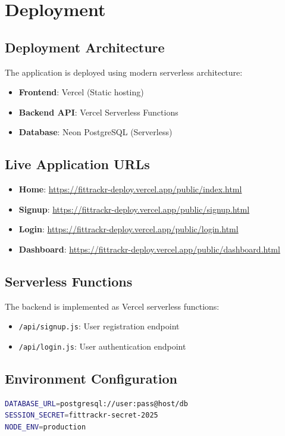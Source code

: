 \documentclass[12pt,a4paper]{article}
\begin{document}
\section{Deployment}

\subsection{Deployment Architecture}
The application is deployed using modern serverless architecture:

\begin{itemize}
    \item \textbf{Frontend}: Vercel (Static hosting)
    \item \textbf{Backend API}: Vercel Serverless Functions
    \item \textbf{Database}: Neon PostgreSQL (Serverless)
\end{itemize}

\subsection{Live Application URLs}
\begin{itemize}
    \item \textbf{Home}: \url{https://fittrackr-deploy.vercel.app/public/index.html}
    \item \textbf{Signup}: \url{https://fittrackr-deploy.vercel.app/public/signup.html}
    \item \textbf{Login}: \url{https://fittrackr-deploy.vercel.app/public/login.html}
    \item \textbf{Dashboard}: \url{https://fittrackr-deploy.vercel.app/public/dashboard.html}
\end{itemize}

\subsection{Serverless Functions}
The backend is implemented as Vercel serverless functions:
\begin{itemize}
    \item \texttt{/api/signup.js}: User registration endpoint
    \item \texttt{/api/login.js}: User authentication endpoint
\end{itemize}

\subsection{Environment Configuration}
\begin{lstlisting}[language=bash]
DATABASE_URL=postgresql://user:pass@host/db
SESSION_SECRET=fittrackr-secret-2025
NODE_ENV=production
\end{lstlisting}
\end{document}
